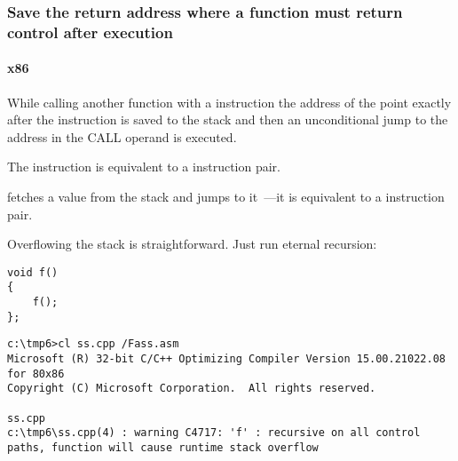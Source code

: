 \subsubsection{
{Save the return address where a function must return control after execution}}

\paragraph{x86}

{While calling another function with a \CALL instruction the address of the point exactly after the \CALL instruction is saved 
to the stack and then an unconditional jump to the address in the CALL operand is executed.} 

{The \CALL instruction is equivalent to a  instruction pair}.

{\RET fetches a value from the stack and jumps to it~---it is equivalent to a  instruction pair.}

\index{\Recursion}
{Overflowing the stack is straightforward. Just run eternal recursion:}

\begin{lstlisting}
void f()
{
	f();
};
\end{lstlisting}


\begin{lstlisting}
c:\tmp6>cl ss.cpp /Fass.asm
Microsoft (R) 32-bit C/C++ Optimizing Compiler Version 15.00.21022.08 for 80x86
Copyright (C) Microsoft Corporation.  All rights reserved.

ss.cpp
c:\tmp6\ss.cpp(4) : warning C4717: 'f' : recursive on all control paths, function will cause runtime stack overflow
\end{lstlisting}

